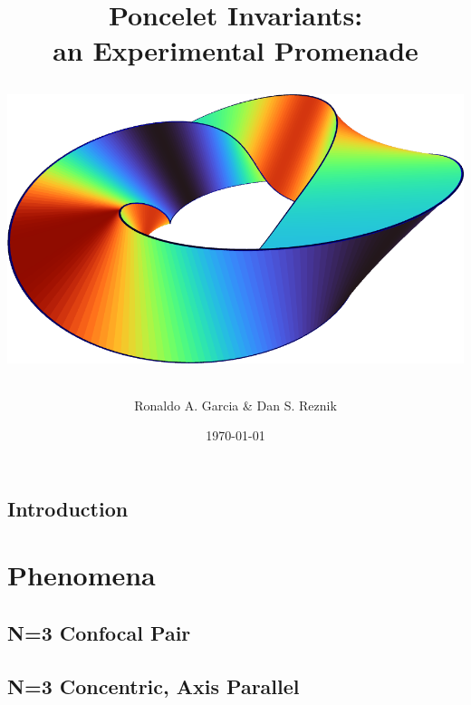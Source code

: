\documentclass{book}
\begin{document}

\title{
{\bf Poncelet Invariants:}\\
{\bf an Experimental Promenade}
\author{Ronaldo A. Garcia \& Dan S. Reznik} 
\date{\today}
 \vfill
{\includegraphics[totalheight=2.2in]{001_front_cover.png}}
}


\maketitle

\chapter{Introduction}
\label{chap:01-intro}
%

\part{ Phenomena}

\chapter{N=3 Confocal Pair}
\label{chap:03-n3-confocal}
%

\chapter{N=3 Concentric, Axis Parallel}
\label{chap:03-n3-cap}
%
\end{document}
